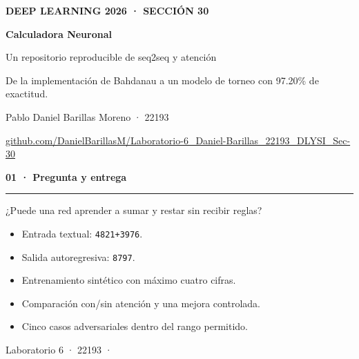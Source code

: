 \documentclass[12pt,letterpaper]{article}
\newenvironment{slide}[1]{%
  \clearpage\noindent
  {\color{ElectricBlue}\fontsize{26}{30}\selectfont\bfseries #1\par}
  {\color{NeonCyan}\rule{\textwidth}{3pt}}\vspace{.45cm}
}{\vfill\hfill{\small\color{DarkGray}Laboratorio 6 · 22193 · \thepage}}
\begin{document}
\pagecolor{DarkGray}\color{white}
\vspace*{1.1cm}
{\color{NeonCyan}\bfseries DEEP LEARNING 2026 · SECCIÓN 30\par}
\vspace{.65cm}
{\fontsize{38}{44}\selectfont\bfseries Calculadora Neuronal\par}
{\fontsize{24}{30}\selectfont Un repositorio reproducible de seq2seq y atención\par}
\vspace{.8cm}
\colorbox{ElectricBlue}{\parbox{.88\textwidth}{\color{white}\large
De la implementación de Bahdanau a un modelo de torneo con 97.20\% de exactitud.}}
\vfill
{\large Pablo Daniel Barillas Moreno · 22193}\par
\href{https://github.com/DanielBarillasM/Laboratorio-6_Daniel-Barillas_22193_DLYSI_Sec-30}{\color{NeonCyan}github.com/DanielBarillasM/Laboratorio-6\_Daniel-Barillas\_22193\_DLYSI\_Sec-30}
\clearpage\nopagecolor\color{DarkGray}

\begin{slide}{01 · Pregunta y entrega}
\begin{minipage}{.52\textwidth}
{\Large ¿Puede una red aprender a sumar y restar sin recibir reglas?}
\vspace{.4cm}
\begin{itemize}
\item Entrada textual: \texttt{4821+3976}.
\item Salida autoregresiva: \texttt{8797}.
\item Entrenamiento sintético con máximo cuatro cifras.
\item Comparación con/sin atención y una mejora controlada.
\item Cinco casos adversariales dentro del rango permitido.
\end{itemize}
\end{minipage}\hfill
\begin{minipage}{.42\textwidth}
\end{minipage}
\end{slide}
\end{document}
